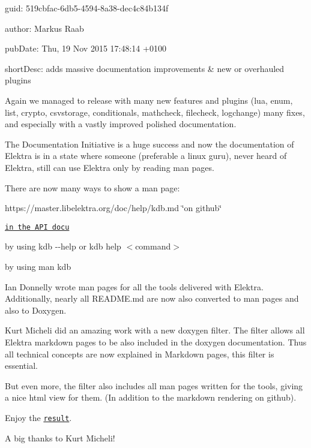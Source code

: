 
\begin{DoxyItemize}
\item guid\+: 519cbfac-\/6db5-\/4594-\/8a38-\/dec4c84b134f
\item author\+: Markus Raab
\item pub\+Date\+: Thu, 19 Nov 2015 17\+:48\+:14 +0100
\item short\+Desc\+: adds massive documentation improvements \& new or overhauled plugins
\end{DoxyItemize}

Again we managed to release with many new features and plugins (lua, enum, list, crypto, csvstorage, conditionals, mathcheck, filecheck, logchange) many fixes, and especially with a vastly improved polished documentation.

The Documentation Initiative is a huge success and now the documentation of Elektra is in a state where someone (preferable a linux guru), never heard of Elektra, still can use Elektra only by reading man pages.

There are now many ways to show a man page\+:


\begin{DoxyItemize}
\item https\+://master.libelektra.\+org/doc/help/kdb.md \char`\"{}on github\char`\"{}
\item \href{https://doc.libelektra.org/api/master/html/doc_help_kdb_md.html}{\tt in the A\+PI docu}
\item by using {\ttfamily kdb -\/-\/help} or {\ttfamily kdb help $<$command$>$}
\item by using {\ttfamily man kdb}
\end{DoxyItemize}

Ian Donnelly wrote man pages for all the tools delivered with Elektra. Additionally, nearly all R\+E\+A\+D\+M\+E.\+md are now also converted to man pages and also to Doxygen.

Kurt Micheli did an amazing work with a new doxygen filter. The filter allows all Elektra markdown pages to be also included in the doxygen documentation. Thus all technical concepts are now explained in Markdown pages, this filter is essential.

But even more, the filter also includes all man pages written for the tools, giving a nice html view for them. (In addition to the markdown rendering on github).

Enjoy the \href{https://doc.libelektra.org/api/0.8.14/html/}{\tt result}.

A big thanks to Kurt Micheli!


